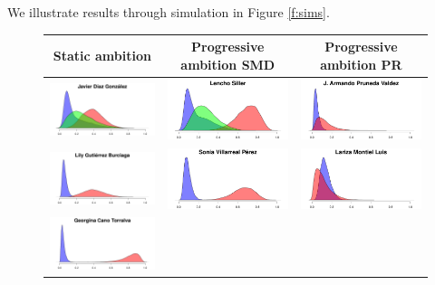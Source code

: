 \documentclass[letter,12pt]{article}
\begin{document}
We illustrate results through simulation in Figure \ref{f:sims}. 

\begin{figure}
  \centering
  \begin{tabular}{ccc}
    Static ambition & Progressive ambition SMD & Progressive ambition PR \\ \hline
    \includegraphics[width=.3\columnwidth]{../graphs/prReconoce1.pdf} &
    \includegraphics[width=.3\columnwidth]{../graphs/prReconoce6.pdf} &
    \includegraphics[width=.3\columnwidth]{../graphs/prReconoce8.pdf} \\
    \includegraphics[width=.3\columnwidth]{../graphs/prReconoce2.pdf} &
    \includegraphics[width=.3\columnwidth]{../graphs/prReconoce5.pdf} &
    \includegraphics[width=.3\columnwidth]{../graphs/prReconoce7.pdf} \\
    \includegraphics[width=.3\columnwidth]{../graphs/prReconoce3.pdf} &

\end{tabular}
\end{figure}
\end{document}
